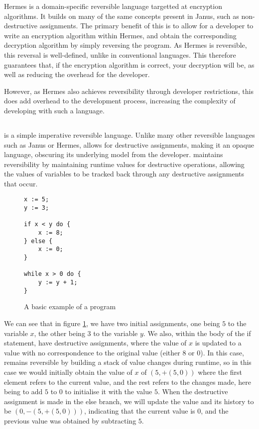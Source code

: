 Hermes is a domain-specific reversible language targetted at encryption algorithms\cite{Hermes, HermesExtension}. It builds on many of the same concepts present in Janus, such as non-destructive assignments. 
The primary benefit of this is to allow for a developer to write an encryption algorithm within Hermes, and obtain the corresponding decryption algorithm by simply reversing the program. As Hermes is reversible, this reversal is well-defined, unlike in conventional languages. This therefore guarantees that, if the encryption algorithm is correct, your decryption will be, as well as reducing the overhead for the developer.

However, as Hermes also achieves reversibility through developer restrictions, this does add overhead to the development process, increasing the complexity of developing with such a language.

\subsection{\rimplang}

\rimplang is a simple imperative reversible language. Unlike many other reversible languages such as Janus or Hermes, \rimplang allows for destructive assignments, making it an opaque language, obscuring its underlying model from the developer. \rimplang maintains reversibility by maintaining runtime values for destructive operations, allowing the values of variables to be tracked back through any destructive assignments that occur\cite{Rimp}.

\begin{figure}[ht]
    \centering
    \begin{lstlisting}[label={lst:rimpruntime}, basicstyle=\small]
x := 5;
y := 3;

if x < y do {
    x := 8;
} else {
    x := 0;
}

while x > 0 do {
    y := y + 1;
}
    \end{lstlisting}
    \caption{A basic example of a \rimplang program}
    \label{fig:rimpruntime}
\end{figure}

We can see that in figure \ref{fig:rimpruntime}, we have two initial assignments, one being $5$ to the variable $x$, the other being $3$ to the variable $y$. We also, within the body of the if statement, have destructive assignments, where the value of $x$ is updated to a value with no correspondence to the original value (either $8$ or $0$). In this case, \rimp remains reversible by building a stack of value changes during runtime, so in this case we would initially obtain the value of $x$ of $(5, +(5, 0))$ where the first element refers to the current value, and the rest refers to the changes made, here being to add $5$ to $0$ to initialise it with the value $5$. When the destructive assignment is made in the else branch, we will update the value and its history to be $(0, -(5, +(5, 0)))$, indicating that the current value is $0$, and the previous value was obtained by subtracting $5$.

